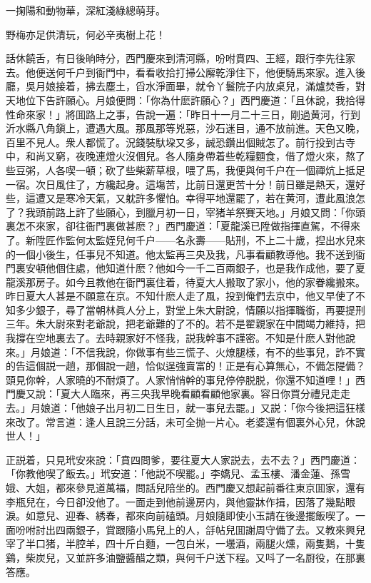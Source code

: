 \begin{myquote}
一掬陽和動物華，深紅淺綠總萌芽。

野梅亦足供清玩，何必辛夷樹上花！
\end{myquote}

話休饒舌，有日後晌時分，西門慶來到清河縣，吩咐賁四、王經，跟行李先往家去。他便送何千户到衙門中，看看收拾打掃公廨乾淨住下，他便騎馬來家。進入後廳，吳月娘接着，拂去塵土，舀水淨面畢，就令丫鬟院子内放桌兒，滿爐焚香，對天地位下告許願心。月娘便問：「你為什麽許願心？」西門慶道：「且休說，我拾得性命來家！」將囬路上之事，告說一遍：「昨日十一月二十三日，剛過黄河，行到沂水縣八角鎭上，遭遇大風。那風那等兇惡，沙石迷目，通不放前進。天色又晚，百里不見人。衆人都慌了。況錢裝馱垜又多，誠恐鑽出個賊怎了。前行投到古寺中，和尚又窮，夜晚連燈火沒個兒。各人隨身帶着些乾糧麵食，借了燈火來，熬了些豆粥，人各喫一頓；砍了些柴薪草根，喂了馬，我便與何千户在一個禪炕上抵足一宿。次日風住了，方纔起身。這塲苦，比前日還更苦十分！前日雖是熱天，還好些，這遭又是寒冷天氣，又躭許多懼怕。幸得平地還罷了，若在黄河，遭此風浪怎了？我頭前路上許了些願心，到臘月初一日，宰猪羊祭賽天地。」月娘又問：「你頭裏怎不來家，卻往衙門裏做甚麽？」西門慶道：「夏龍溪已陞做指揮直駕，不得來了。新陞匠作監何太監姪兒何千户——名永壽——貼刑，不上二十歲，揑出水兒來的一個小後生，任事兒不知道。他太監再三央及我，凡事看顧教導他。我不送到衙門裏安頓他個住處，他知道什麽？他如今一千二百兩銀子，也是我作成他，要了夏龍溪那房子。如今且教他在衙門裏住着，待夏大人搬取了家小，他的家眷纔搬來。昨日夏大人甚是不願意在京。不知什麽人走了風，投到俺們去京中，他又早使了不知多少銀子，尋了當朝林眞人分上，對堂上朱大尉說，情願以指揮職銜，再要提刑三年。朱大尉來對老爺說，把老爺難的了不的。若不是翟親家在中間竭力維持，把我撐在空地裏去了。去時親家好不怪我，説我幹事不謹密。不知是什麽人對他說來。」月娘道：「不信我說，你做事有些三慌子、火燎腿樣，有不的些事兒，詐不實的告這個説一趟，那個說一趟，恰似逞強賣富的！正是有心算無心，不備怎隄備？頭見你幹，人家曉的不耐煩了。人家悄悄幹的事兒停停脱脱，你還不知道哩！」西門慶又說：「夏大人臨來，再三央我早晚看顧看顧他家裏。容日你買分禮兒走走去。」月娘道：「他娘子出月初二日生日，就一事兒去罷。」又説：「你今後把這狂樣來改了。常言道：逢人且說三分話，未可全抛一片心。老婆還有個裏外心兒，休說世人！」

正説着，只見玳安來說：「賁四問爹，要往夏大人家説去，去不去？」西門慶道：「你教他喫了飯去。」玳安道：「他説不喫罷。」李嬌兒、孟玉樓、潘金蓮、孫雪娥、大姐，都來參見道萬福，問話兒陪坐的。西門慶又想起前番往東京囬家，還有李瓶兒在，今日卻没他了。一面走到他前邊房内，與他靈牀作揖，因落了幾點眼淚。如意兒、迎春、綉春，都來向前磕頭。月娘隨即使小玉請在後邊擺飯喫了。一面吩咐討出四兩銀子，賞跟隨小馬兒上的人，㧱帖兒囬謝周守備了去。又教來興兒宰了半口猪，半腔羊，四十斤白麵，一包白米，一壜酒，兩腿火燻，兩隻鵝，十隻鷄，柴炭兒，又並許多油鹽醬醋之類，與何千户送下程。又呌了一名厨役，在那裏答應。

